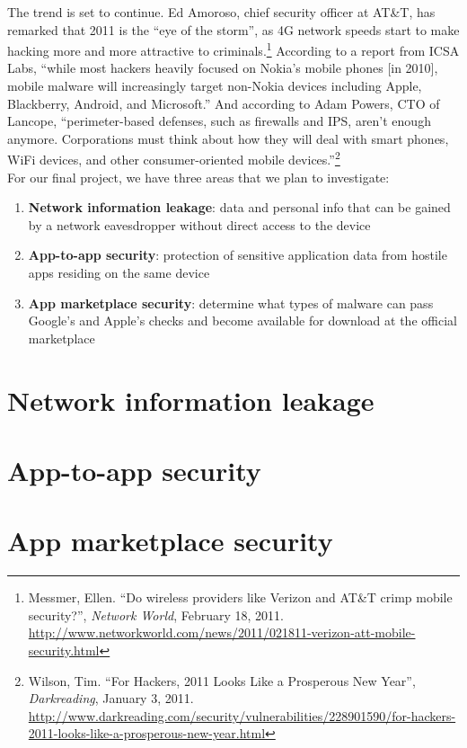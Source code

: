 \documentclass[11pt]{article}
\begin{document}
The trend is set to continue. Ed Amoroso, chief security officer at AT\&T, has remarked that 2011 is the ``eye of the storm'', as 4G network speeds start to make hacking more and more attractive to criminals.\footnote{Messmer, Ellen. ``Do wireless providers like Verizon and AT\&T crimp mobile security?'', \textit{Network World}, February 18, 2011. \url{http://www.networkworld.com/news/2011/021811-verizon-att-mobile-security.html}} According to a report from ICSA Labs, ``while most hackers heavily focused on Nokia's mobile phones [in 2010], mobile malware will increasingly target non-Nokia devices including Apple, Blackberry, Android, and Microsoft.'' And according to Adam Powers, CTO of Lancope, ``perimeter-based defenses, such as firewalls and IPS, aren't enough anymore. Corporations must think about how they will deal with smart phones, WiFi devices, and other consumer-oriented mobile devices.''\footnote{Wilson, Tim. ``For Hackers, 2011 Looks Like a Prosperous New Year'', \textit{Darkreading}, January 3, 2011. \url{http://www.darkreading.com/security/vulnerabilities/228901590/for-hackers-2011-looks-like-a-prosperous-new-year.html}}\\

For our final project, we have three areas that we plan to investigate:
\begin{enumerate}
\item \textbf{Network information leakage}: data and personal info that can be gained by a network eavesdropper without direct access to the device
\item \textbf{App-to-app security}: protection of sensitive application data from hostile apps residing on the same device
\item \textbf{App marketplace security}: determine what types of malware can pass Google's and Apple's checks and become available for download at the official marketplace
\end{enumerate}

\section{Network information leakage}

\section{App-to-app security}

\section{App marketplace security}
\end{document}
